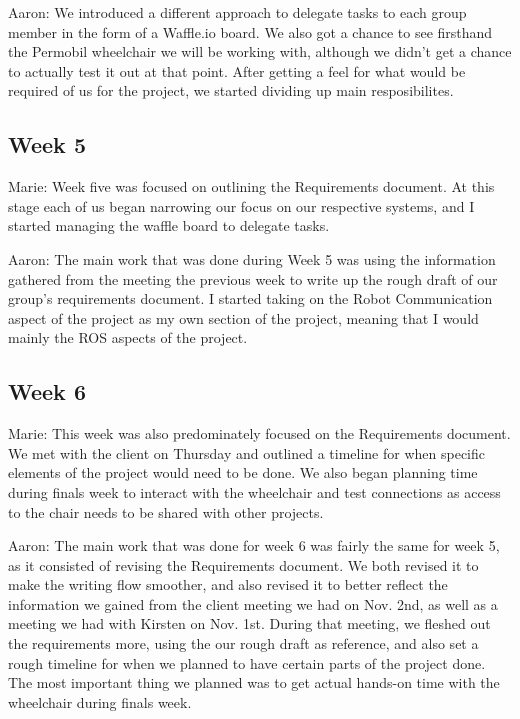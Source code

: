 \documentclass[onecolumn, draftclsnofoot,10pt, compsoc]{IEEEtran}
\begin{document}
Aaron: We introduced a different approach to delegate tasks to each group member in the form of a Waffle.io board. We also got a chance to see firsthand the Permobil wheelchair we will be working with, although we didn't get a chance to actually test it out at that point. After getting a feel for what would be required of us for the project, we started dividing up main resposibilites.\par

\subsection{Week 5}
Marie: Week five was focused on outlining the Requirements document. At this stage each of us began narrowing our focus on our respective systems, and I started managing the waffle board to delegate tasks.\par

Aaron: The main work that was done during Week 5 was using the information gathered from the meeting the previous week to write up the rough draft of our group's requirements document. I started taking on the Robot Communication aspect of the project as my own section of the project, meaning that I would mainly the ROS aspects of the project.\par

\subsection{Week 6}
Marie: This week was also predominately focused on the Requirements document. We met with the client on Thursday and outlined a timeline for when specific elements of the project would need to be done. We also began planning time during finals week to interact with the wheelchair and test connections as access to the chair needs to be shared with other projects.\par

Aaron: The main work that was done for week 6 was fairly the same for week 5, as it consisted of revising the Requirements document. We both revised it to make the writing flow smoother, and also revised it to better reflect the information we gained from the client meeting we had on Nov. 2nd, as well as a meeting we had with Kirsten on Nov. 1st. During that meeting, we fleshed out the requirements more, using the our rough draft as reference, and also set a rough timeline for when we planned to have certain parts of the project done. The most important thing we planned was to get actual hands-on time with the wheelchair during finals week.\par
\end{document}
